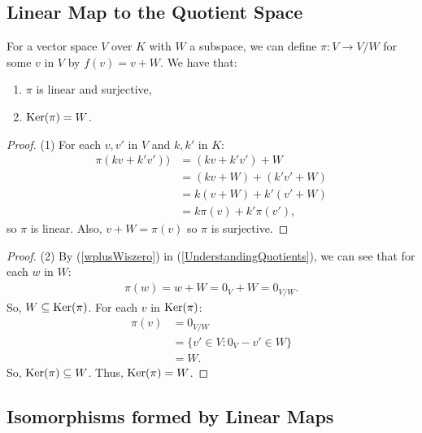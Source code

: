 \subsection{Linear Map to the Quotient Space}

For a vector space $V$ over $K$ with $W$ a subspace, we can
define $\pi : V \to V/W$ for some $v$ in $V$ by $f(v) = v + W$.
We have that: \begin{enumerate}
  \item $\pi$ is linear and surjective,
  \item $\operatorname{Ker}(\pi) = W$.
\end{enumerate}
\begin{proof}
  (1) For each $v, v'$ in $V$ and $k, k'$ in $K$: \begin{align*}
    \pi(kv + k'v')) &= (kv + k'v') + W \\
    &= (kv + W) + (k'v' + W) \\
    &= k(v + W) + k'(v' + W) \\
    &= k\pi(v) + k'\pi(v'),
  \end{align*} so $\pi$ is linear. Also, $v + W = \pi(v)$ so $\pi$ 
  is surjective.
\end{proof}
\begin{proof}
  (2) By (\ref{wplusWiszero}) in (\ref{UnderstandingQuotients}),
  we can see that for each $w$ in $W$: \begin{gather*}
    \pi(w) = w + W = 0_V + W = 0_{V/W}.
  \end{gather*} So, $W \subseteq \operatorname{Ker}(\pi)$. For each $v$ in $\operatorname{Ker}(\pi)$: 
  \begin{align*}
    \pi(v) &= 0_{V/W} \\
    &= \{v' \in V : 0_V - v' \in W\} \\
    &= W.
  \end{align*} So, $\operatorname{Ker}(\pi) \subseteq W$. Thus, $\operatorname{Ker}(\pi) = W$.
\end{proof}

\subsection{Isomorphisms formed by Linear Maps}

